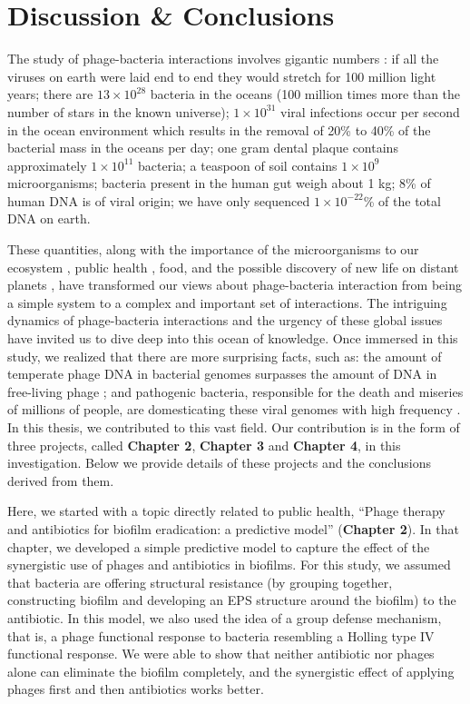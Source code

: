\chapter{Discussion \& Conclusions}
The study of phage-bacteria interactions involves gigantic numbers \cite{noauthor_microbiology_2011}: if all the viruses on earth were laid end to end they would stretch for 100 million light years; there are $13\times10^{28}$ bacteria in the oceans (100 million times more than the number of stars in the known universe); $1\times10^{31}$ viral infections occur per second in the ocean environment which results in the removal of  20\% to 40\% of the bacterial mass in the oceans per day;  one gram dental plaque contains approximately $1\times10^{11}$ bacteria; a teaspoon of soil  contains $1\times 10^{9}$ microorganisms; bacteria present in the human gut weigh about 1 kg; 8\% of human DNA is of viral origin;  we have only sequenced $1\times10^{-22}$\% of the total DNA on earth.

These quantities, along with the importance of the microorganisms to our ecosystem \cite{gibbons_microbial_2015, graham_microbes_2016}, public health \cite{smith_microbiology_2015}, food, and the possible discovery of new life on distant planets \cite{lopez_inevitable_2019}, have transformed our views about phage-bacteria interaction from being a simple system to a complex and important set of interactions. The intriguing dynamics of phage-bacteria interactions and the urgency of these global issues have invited us to dive deep into this ocean of knowledge. Once immersed in this study, we realized that there are more surprising facts, such as: the amount of temperate phage DNA in bacterial genomes surpasses the amount of DNA in free-living phage \cite{wahl_prophage_2017}; and pathogenic bacteria, responsible for the death and miseries of millions of people,  are domesticating these viral genomes with high frequency \cite{fortier_importance_2013}. In this thesis, we contributed to this vast field. Our contribution is in the form of three projects, called \textbf{Chapter 2}, \textbf{Chapter 3} and \textbf{Chapter 4}, in this investigation. Below we provide details of these projects and the conclusions derived from them. 

Here, we started with a topic directly related to public health, “Phage therapy and antibiotics for biofilm eradication: a predictive model” (\textbf{Chapter 2}). In that chapter, we developed a simple predictive model to capture the effect of the synergistic use of phages and antibiotics in biofilms. For this study, we assumed that bacteria are offering structural resistance (by grouping together, constructing biofilm and developing an EPS structure around the biofilm) to the antibiotic. In this model, we also used the idea of a group defense mechanism, that is, a phage functional response to bacteria resembling a Holling type IV functional response. We were able to show that neither antibiotic nor phages alone can eliminate the biofilm completely, and the synergistic effect of applying phages first and then antibiotics works better. 

